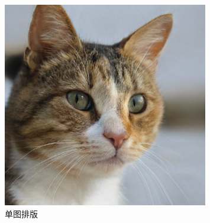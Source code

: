 \documentclass[12pt,a4paper,UTF8]{article}
\begin{document}
    \begin{figure}[!htbp]
        \centering
        \includegraphics[width=0.8\textwidth]{example}
        \caption{单图排版}
    \end{figure}
\end{document}
